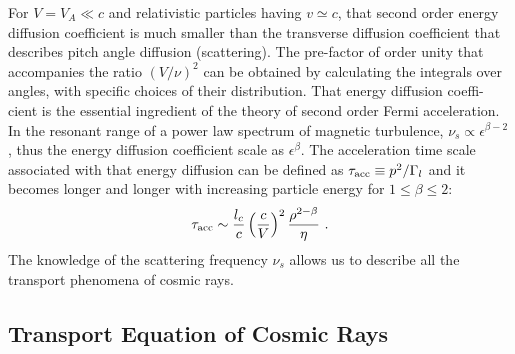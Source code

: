 \documentclass[12pt,a4paper]{article}
\begin{document}
For $V = V_A \ll c$ and relativistic particles having $v \simeq c$, that second order energy diffusion coefficient is much smaller than the transverse diffusion coefficient that describes pitch angle diffusion (scattering). The pre-factor of order unity that accompanies the ratio $(V/\nu)^2$ can be obtained by calculating the integrals over angles, with specific choices of their distribution. That energy diffusion coeffi- cient is the essential ingredient of the theory of second order Fermi acceleration. In the resonant range of a power law spectrum of magnetic turbulence, $\nu_s \propto \epsilon^{\beta-2}$, thus the energy diffusion coefficient scale as $\epsilon^{\beta}$. The acceleration time scale associated with that energy diffusion can be defined as $\tau_{\rm acc} \equiv p^2/\Gamma_l$ and it becomes longer and longer with increasing particle energy for $1 \leqslant \beta \leqslant 2$:
\begin{equation}
\tau_{\rm acc} \sim \frac{l_c}{c} \left(\frac{c}{V} \right)^2 \frac{\rho^{2-\beta}}{\eta} ~.
\end{equation}
The knowledge of the scattering frequency $\nu_s$ allows us to describe all the transport phenomena of cosmic rays.

\subsection{Transport Equation of Cosmic Rays}
\end{document}
